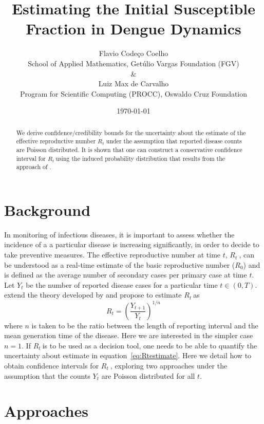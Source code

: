 \documentclass[12pt]{article}
\title{
Estimating the Initial Susceptible Fraction in Dengue Dynamics
}
\author{Flavio Code\c{c}o Coelho \\
School of Applied Mathematics, Get\'ulio Vargas Foundation (FGV) \\
\& \\
Luiz Max de Carvalho \\
Program for Scientific Computing (PROCC), Oswaldo Cruz Foundation}
\date{\today}
\def \rr {$R_{t}\ $}
\begin{document}
                                  


%
\maketitle
\begin{abstract}
We derive confidence/credibility bounds for the uncertainty about the estimate of the effective reproductive number $R_t$ under the assumption that reported disease counts are Poisson distributed.
It is shown that one can construct a conservative confidence interval for \rr using the induced probability distribution that results from the approach of \citet{mantel}.
\end{abstract}
\section{Background}
\label{sec:intro}

In monitoring of infectious diseases, it is important to assess whether the incidence of a a particular disease is increasing significantly, in order to decide to take preventive measures.
The effective reproductive number at time $t$, \rr, can be understood as a real-time estimate of the basic reproductive number ($R_{0}$) and is defined as the average number of secondary cases per primary case at time $t$.
Let $Y_t$ be the number of reported disease cases for a particular time $t \in (0, T)$.
\citet{nishiura} extend the theory developed by \citet{stallybrass} and propose to estimate \rr as
\begin{equation}
\label{eq:Rtestimate}
R_t = \left( \frac{Y_{t+1}}{Y_t}\right)^{1/n}
\end{equation}
where $n$ is taken to be the ratio between the length of reporting interval and the mean generation time of the disease.
Here we are interested in the simpler case $n=1$.
If \rr is to be used as a decision tool, one needs to be able to quantify the uncertainty about estimate in equation~\ref{eq:Rtestimate}. 
Here we detail how to obtain confidence intervals for \rr, exploring two approaches under the assumption that the counts $Y_t$ are Poisson distributed for all $t$.

\newpage
\section{Approaches}
\end{document}
